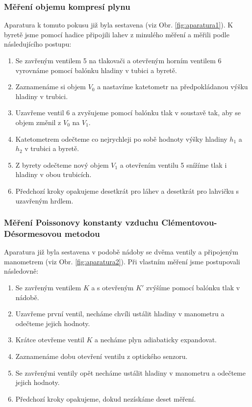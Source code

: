 \documentclass[english]{article}
\begin{document}
			\subsubsection{Měření objemu kompresí plynu}
					Aparatura k tomuto pokusu již byla sestavena (viz Obr. \ref{fig:aparatura1}). K byretě jsme pomocí hadice připojili lahev z minulého měření a měřili podle následujícího postupu:
					\begin{enumerate}
							\item Se zavřeným ventilem 5 na tlakovači a otevřeným horním ventilem 6 vyrovnáme pomocí balónku hladiny v tubici a byretě.
							\item Zaznamenáme si objem $V_0$ a nastavíme katetometr na předpokládanou výšku hladiny v trubici.
							\item Uzavřeme ventil 6 a zvyšujeme pomocí balónku tlak v soustavě tak, aby se objem změnil z $V_0$ na $V_1$. 
							\item Katetometrem odečteme co nejrychleji po sobě hodnoty výšky hladiny $h_1$ a $h_2$ v trubici a byretě.
							\item Z byrety odečteme nový objem $V_1$ a otevřením ventilu 5 snížíme tlak i hladiny v obou trubicích.
							\item Předchozí kroky opakujeme desetkrát pro láhev a desetkrát pro lahvičku s uzavřeným hrdlem.
					\end{enumerate}
					 
			\subsubsection{Měření Poissonovy konstanty vzduchu Clémentovou-Désormesovou metodou}
					Aparatura již byla sestavena v podobě nádoby se dvěma ventily a připojeným manometrem (viz Obr. \ref{fig:aparatura2}). Při vlastním měření jsme postupovali následovně:
					\begin{enumerate}
							\item Se zavřeným ventilem $K$ a s otevřeným $K'$ zvýšíme pomocí balónku tlak v nádobě. 
							\item Uzavřeme první ventil, necháme chvíli ustálit hladiny v manometru a odečteme jejich hodnoty.
							\item Krátce otevřeme ventil $K$ a necháme plyn adiabaticky expandovat.
							\item Zaznamenáme dobu otevření ventilu z optického senzoru.
							\item Se zavřenými ventily opět necháme ustálit hladiny v manometru a odečteme jejich hodnoty.
							\item Předchozí kroky opakujeme, dokud nezískáme deset měření.
					\end{enumerate}
							
\end{document}
